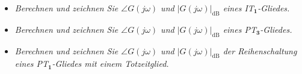 %
%
\begin{Summary}{}{}
	\begin{itemize}
		\item \textit{Berechnen und zeichnen Sie $\angle G(j\omega)$ und $|G(j\omega)|_{\text{dB}}$ eines IT$_{\boldsymbol{1}}$-Gliedes.}
		\item \textit{Berechnen und zeichnen Sie $\angle G(j\omega)$ und $|G(j\omega)|_{\text{dB}}$ eines PT$_{\boldsymbol{3}}$-Gliedes.}
		\item \textit{Berechnen und zeichnen Sie $\angle G(j\omega)$ und $|G(j\omega)|_{\text{dB}}$ der Reihenschaltung eines PT$_{\boldsymbol{1}}$-Gliedes mit einem Totzeitglied.}
	\end{itemize}
\end{Summary}
